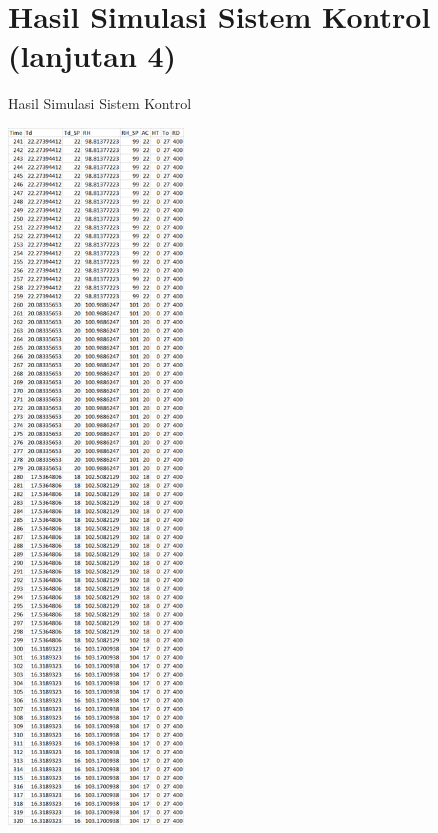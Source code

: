 \section{Hasil Simulasi Sistem Kontrol (lanjutan 4)}
\begin{table}[!h]
	\caption{Hasil Simulasi Sistem Kontrol}
	\label{tbl:A:HasilSimulasiKontrol4}
	\centering
	\includegraphics[width=0.35\textwidth]{figures/HasilSimulasiSimulink4}
\end{table}